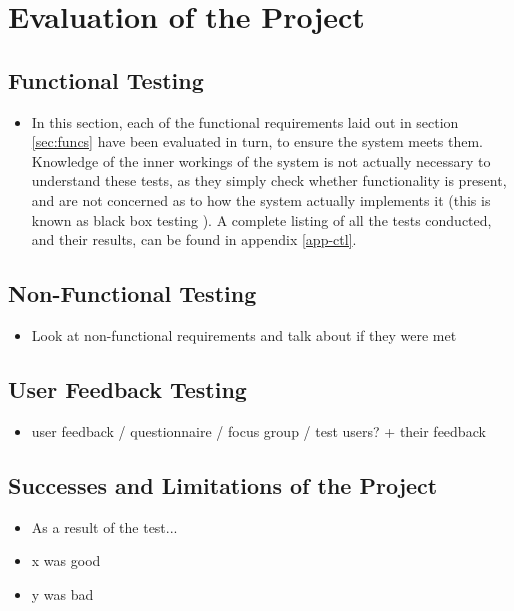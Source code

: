 \section{Evaluation of the Project}

\subsection{Functional Testing}
{\color{red}
	\begin{itemize}
		\item In this section, each of the functional requirements laid out in section \ref{sec:funcs} have been evaluated in turn, to ensure the system meets them. Knowledge of the inner workings of the system is not actually necessary to understand these tests, as they simply check whether functionality is present, and are not concerned as to how the system actually implements it (this is known as black box testing \cite{beizer1995black}). A complete listing of all the tests conducted, and their results, can be found in appendix \ref{app-ctl}.
	\end{itemize}
}

\subsection{Non-Functional Testing}
{\color{red}
	\begin{itemize}
		\item Look at non-functional requirements and talk about if they were met
	\end{itemize}
}

\subsection{User Feedback Testing}
{\color{red}
	\begin{itemize}
		\item user feedback / questionnaire / focus group / test users? + their feedback
	\end{itemize}
}

\subsection{Successes and Limitations of the Project}
{\color{red}
	\begin{itemize}
		\item As a result of the test...
		\item x was good
		\item y was bad
	\end{itemize}
}
